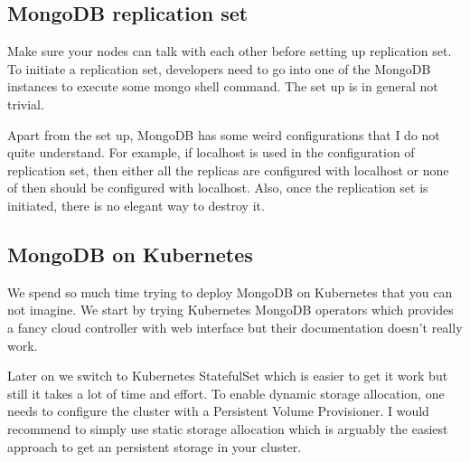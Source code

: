 \documentclass[sigconf]{acmart}
\begin{document}
\subsection{MongoDB replication set}
Make sure your nodes can talk with each other before setting up replication set. To initiate a replication set, developers need to go into one of the MongoDB instances to execute some mongo shell command. The set up is in general not trivial. 

Apart from the set up, MongoDB has some weird configurations that I do not quite understand. For example, if localhost is used in the configuration of replication set, then either all the replicas are configured with localhost or none of then should be configured with localhost. Also, once the replication set is initiated, there is no elegant way to destroy it.

\subsection{MongoDB on Kubernetes}
We spend so much time trying to deploy MongoDB on Kubernetes that you can not imagine. We start by trying Kubernetes MongoDB operators which provides a fancy cloud controller with web interface but their documentation doesn't really work.

Later on we switch to Kubernetes StatefulSet which is easier to get it work but still it takes a lot of time and effort. To enable dynamic storage allocation, one needs to configure the cluster with a Persistent Volume Provisioner. I would recommend to simply use static storage allocation which is arguably the easiest approach to get an persistent storage in your cluster. 
\end{document}
